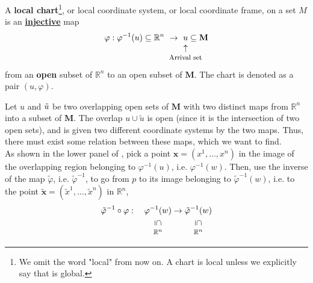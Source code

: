 \documentclass[../main.tex]{subfiles}
\begin{document}
\begin{definition}
A \textbf{local chart}\footnote{We omit the word "local" from now on. A chart is local unless we explicitly say that is global.},  or local coordinate system, or local coordinate frame, on a set $M$ is an \underline{\textbf{injective}} map
\[
\varphi: \varphi^{-1}(u)\subseteq \mathbb{R}^n \ \rightarrow \ \underset{\mathclap{\tikz \node {$\uparrow$} node [below=1ex] {\footnotesize Arrival set};}}{u} \subseteq \mathbf{M}
\]
from an \textbf{open} subset of $\mathbb{R}^n$ to an open subset of $\mathbf{M}$. The chart is denoted as a pair
\(
\left(u,\varphi\right)
\).
\end{definition}
Let $u$ and $\Tilde{u}$ be two overlapping open sets of $\mathbf{M}$ with two distinct maps from $\mathbb{R}^n$ into a subset of $\mathbf{M}$. The overlap $u\cup\tilde{u}$ is open (since it is the intersection of two open sets), and is given two different coordinate systems by the two maps. Thus, there must exist some relation between these maps, which we want to find.\\
As shown in the lower panel of , pick a point $\mathbf{x}=(x^1,\dots,x^n)$ in the image of the
overlapping region belonging to $\varphi^{-1}(u)$, i.e. $\varphi^{-1}(w)$. Then, use the inverse of the map $\tilde\varphi$, i.e. $\tilde{\varphi}^{-1}$, to go from $p$ to its image belonging to  $\tilde{\varphi}^{-1}(w)$, i.e. to
the point $\tilde{\mathbf{x}}=(\tilde{x}^1,\dots,\tilde{x}^n)$ in $\mathbb{R}^n$,
\[
\tilde{\varphi}^{-1}\circ\varphi: \quad  \underset{\mathclap{\tikz \node {\rotatebox{-90}{$\subseteq$}} node [below=1ex] {\footnotesize $\mathbb{R}^n$};}}{\varphi^{-1}(w)} \to\underset{\mathclap{\tikz \node {\rotatebox{-90}{$\subseteq$}} node [below=1ex] {\footnotesize $\mathbb{R}^n$};}}{\tilde{\varphi}^{-1}(w)}
\]
\end{document}
